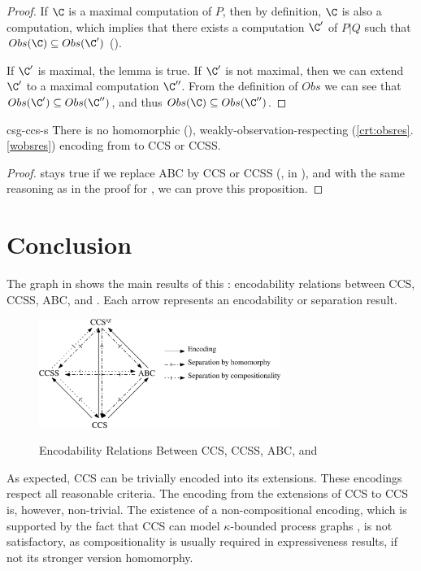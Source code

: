 \documentclass[adraft,hidelinks]{eptcs}
\begin{document}
\begin{proof}
  If $\C$ is a maximal computation of $P$, then by definition, $\C$ is also a computation, which implies that there exists a computation $\C'$ of $P|Q$ such that $\Ob{\C}\subseteq\Ob{\C'}$ ().

  If $\C'$ is maximal, the lemma is true.
  If $\C'$ is not maximal, then we can extend $\C'$ to a maximal computation $\C''$.
  From the definition of $Obs$ we can see that $\Ob{\C'}\subseteq \Ob{\C''}$, and thus $\Ob{\C}\subseteq \Ob{\C''}$.
\end{proof}

\begin{proposition}{csg-ccs-s}
  There is no homomorphic (), weakly-observation-respecting (\ref{crt:obsres}.\ref{wobsres}) encoding from \CSG to CCS or CCSS.
\end{proposition}

\begin{proof}
   stays true if we replace ABC by CCS or CCSS (,  in ), and with the same reasoning as in the proof for , we can prove this proposition.
\end{proof}

\section{Conclusion}
\label{sec:conclusion}
The graph in  shows the main results of this \this: encodability relations between CCS, CCSS, ABC, and \CSG.
Each arrow represents an encodability or separation result.

\begin{figure}[ht]
  \centering
  \caption{Encodability Relations Between CCS, CCSS, ABC, and \CSG}
  \includegraphics[width = 0.7\textwidth]{images/map.eps}
  \label{fig:map}
\end{figure}

As expected, CCS can be trivially encoded into its extensions.
These encodings respect all reasonable criteria.
The encoding from the extensions of CCS to CCS is, however, non-trivial.
The existence of a non-compositional encoding, which is supported by the fact that CCS can model $\kappa$-bounded process graphs \cite{RvG95}, is not satisfactory, as compositionality is usually required in expressiveness results, if not its stronger version homomorphy.
\end{document}
